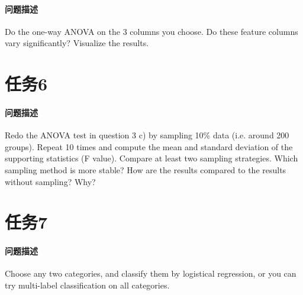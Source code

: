 \documentclass[a4paper,12pt]{article}
\begin{document}
    \paragraph{问题描述} Do the one-way ANOVA on the 3 columns you choose. Do these feature columns vary significantly? Visualize the results.
    
    \section{任务6} %
    \paragraph{问题描述} Redo the ANOVA test in question 3 c) by sampling 10\% data (i.e. around 200 groups). Repeat 10 times and compute the mean and standard deviation of the supporting statistics (F value). Compare at least two sampling strategies. Which sampling method is more stable? How are the results compared to the results without sampling? Why?
    \section{任务7} %
    \paragraph{问题描述} Choose any two categories, and classify them by logistical regression, or you can try multi-label classification on all categories.
    \label{applastpage}
    \newpage
    
    
\iffalse
\begin{itemize}[noitemsep,topsep=0pt]
\end{itemize}
\begin{enumerate}[label=\Roman{*}.,noitemsep,topsep=0pt]
\end{enumerate}
\begin{multicols}{2}
\end{multicols}
\fi
\end{document}
